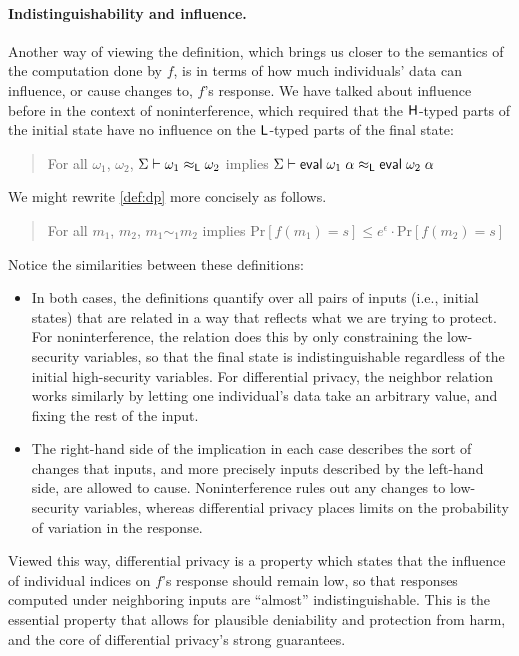 \documentclass[11pt]{article}
\newcommand{\pr}{\mathrm{Pr}}
\begin{document}
\paragraph{Indistinguishability and influence.}
Another way of viewing the definition, which brings us closer to the semantics
of the computation done by $f$, is in terms of how much individuals' data can
influence, or cause changes to, $f$'s response. We have talked about influence
before in the context of noninterference, which required that the $\mathsf{H}$-typed
parts of the initial state have no influence on the $\mathsf{L}$-typed parts of the
final state:

\begin{quote}
  For all $\omega_1$, $\omega_2$,
  $\Sigma \vdash \omega_1 \approx_{\mathsf{L}} \omega_2$ implies
  $\Sigma \vdash \mathsf{eval}\; \omega_1\; \alpha \approx_{\mathsf{L}} \mathsf{eval}\; \omega_2\;
  \alpha$
\end{quote}
We might rewrite \autoref{def:dp} more concisely as follows.
\begin{quote}
  For all $m_1$, $m_2$, $m_1 \sim_1 m_2$ implies
  $\pr[f(m_1) = s] \leq e^\epsilon \cdot \pr[f(m_2) = s]$
\end{quote}

Notice the similarities between these definitions:

\begin{itemize}
\item In both cases, the definitions quantify over all pairs of inputs
  (i.e., initial states) that are related in a way that reflects what we
  are trying to protect. For noninterference, the relation does this by
  only constraining the low-security variables, so that the final state is
  indistinguishable regardless of the initial high-security variables. For
  differential privacy, the neighbor relation works similarly by letting
  one individual's data take an arbitrary value, and fixing the rest of
  the input.

\item The right-hand side of the implication in each case describes the sort of
  changes that inputs, and more precisely inputs described by the left-hand
  side, are allowed to cause. Noninterference rules out any changes to
  low-security variables, whereas differential privacy places limits on the
  probability of variation in the response.
\end{itemize}

Viewed this way, differential privacy is a property which states that the
influence of individual indices on $f$'s response should remain low, so that
responses computed under neighboring inputs are ``almost''
indistinguishable. This is the essential property that allows for plausible
deniability and protection from harm, and the core of differential privacy's
strong guarantees.
\end{document}

